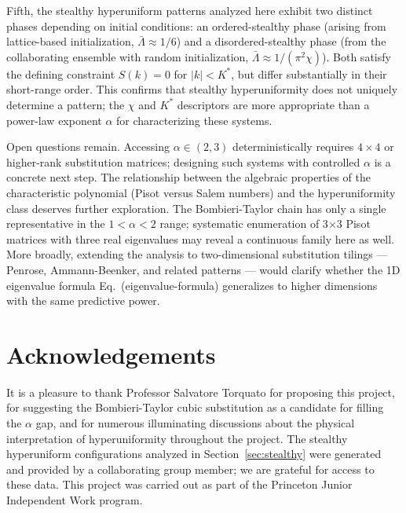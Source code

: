 \documentclass[11pt]{article}
\begin{document}
Fifth, the stealthy hyperuniform patterns analyzed here exhibit two distinct phases
depending on initial conditions: an ordered-stealthy phase (arising from lattice-based
initialization, $\bar\Lambda \approx 1/6$) and a disordered-stealthy phase (from the
collaborating ensemble with random initialization, $\bar\Lambda \approx 1/(\pi^2\chi)$).
Both satisfy the defining constraint $S(k) = 0$ for $|k| < K^*$, but differ substantially
in their short-range order. This confirms that stealthy hyperuniformity does not uniquely
determine a pattern; the $\chi$ and $K^*$ descriptors are more appropriate than a power-law
exponent $\alpha$ for characterizing these systems.

Open questions remain. Accessing $\alpha \in (2, 3)$ deterministically requires $4\times 4$
or higher-rank substitution matrices; designing such systems with controlled $\alpha$ is a
concrete next step. The relationship between the algebraic properties of the characteristic
polynomial (Pisot versus Salem numbers) and the hyperuniformity class deserves further
exploration. The Bombieri-Taylor chain has only a single representative in the $1 < \alpha < 2$
range; systematic enumeration of 3$\times$3 Pisot matrices with three real eigenvalues may
reveal a continuous family here as well. More broadly, extending the analysis to
two-dimensional substitution tilings --- Penrose, Ammann-Beenker, and related patterns ---
would clarify whether the 1D eigenvalue formula Eq.~(eigenvalue-formula)
generalizes to higher dimensions with the same predictive power.

\section*{Acknowledgements}

It is a pleasure to thank Professor Salvatore Torquato for proposing this project, for
suggesting the Bombieri-Taylor cubic substitution as a candidate for filling the $\alpha$
gap, and for numerous illuminating discussions about the physical interpretation of
hyperuniformity throughout the project. The stealthy hyperuniform configurations analyzed
in Section~\ref{sec:stealthy} were generated and provided by a collaborating group member;
we are grateful for access to these data. This project was carried out as part of the
Princeton Junior Independent Work program.
\end{document}
